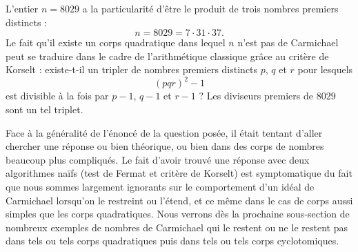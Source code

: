 
\begin{remarque}
L'entier $n = 8029$ a la particularité d'être le produit de trois nombres premiers distincts : \[n = 8029 = 7 \cdot 31 \cdot 37.\] Le fait qu'il existe un corps quadratique dans lequel $n$ n'est pas de Carmichael peut se traduire dans le cadre de l'arithmétique classique grâce au critère de Korselt : existe-t-il un tripler de nombres premiers distincts $p$, $q$ et $r$ pour lesquels \[(pqr)^2 - 1\] est divisible à la fois par $p-1$, $q-1$ et $r-1$ ? Les diviseurs premiers de $8029$ sont un tel triplet.
\end{remarque}

Face à la généralité de l'énoncé de la question posée, il était tentant d'aller chercher une réponse ou bien théorique, ou bien dans des corps de nombres beaucoup plus compliqués. Le fait d'avoir trouvé une réponse avec deux algorithmes naïfs (test de Fermat et critère de Korselt) est symptomatique du fait que nous sommes largement ignorants sur le comportement d'un idéal de Carmichael lorsqu'on le restreint ou l'étend, et ce même dans le cas de corps aussi simples que les corps quadratiques. Nous verrons dès la prochaine sous-section de nombreux exemples de nombres de Carmichael qui le restent ou ne le restent pas dans tels ou tels corps quadratiques puis dans tels ou tels corps cyclotomiques.

